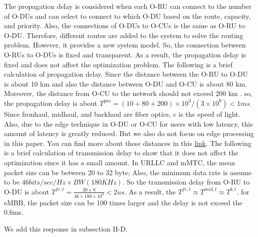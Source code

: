 \documentclass[12pt, letterpaper]{article}
\begin{document}
The propagation delay is considered when each O-RU can connect to the number of O-DUs and can select to connect to which O-DU based on the route, capacity, and priority. Also, the connections of O-DUs to O-CUs is the same as O-RU to O-DU. Therefore, different routes are added to the system to solve the routing problem. However, it provides a new system model. So, the connection between O-RUs to O-DUs is fixed and transparent. As a result, the propagation delay is fixed and does not affect the optimization problem.
The following is a brief calculation of propagation delay.
Since the distance between the O-RU to O-DU is about 10 km and also the distance between O-DU and O-CU is about 80 km. Moreover, the distance from O-CU to the network should not exceed 200 km \cite{oranD1}. so, the propagation delay is about $T^{\text{pro}} = (10 + 80 + 200)\times 10^3 /(3\times 10^8) < 1ms $. Since fronhaul, midhaul, and backhaul are fiber optics, c is the speed of light. Also, due to the edge technique in O-DU or O-CU for users with low latency, this amount of latency is greatly reduced. But we also do not focus on edge processing in this paper. You can find more about these distances in this \href{https://blogs.keysight.com/blogs/inds.entry.html/2020/06/30/5g_testing_what_is-0nzj.html\%23:~:text=The\%20data\%20requirements\%20are\%20about,DUs\%20is\%20about\%2080\%20km.}{link}.
The following is a brief calculation of transmission delay to show that it does not affect the optimization since it has a small amount.
In URLLC and mMTC, the mean packet size can be between 20 to 32 byte; Also, the minimum data rate is assume to be $46 bits/sec/Hz \times BW (180 KHz)$. So the transmission delay from O-RU to O-DU is about $T^{fr,t} = \frac{20\times 8}{46 \times 180 \times 10^3} < 2 us$. As a result, the $T^{fr,t} \approx T^{mid,t} \approx T^{b,t}$. for eMBB, the packet size can be 100 times larger and the delay is not exceed the 0.6ms.

We add this response in subsection II-D.
\end{document}
